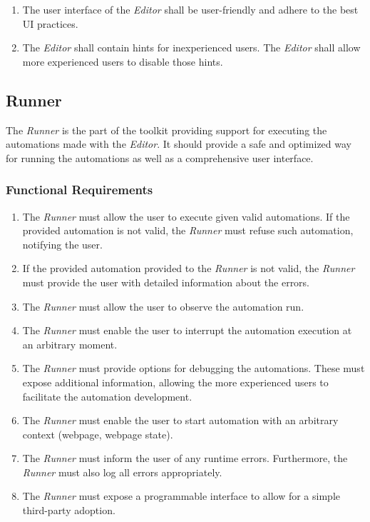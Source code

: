 \begin{enumerate}[label=\thesubsection.2.\arabic*]
    \item The user interface of the \textit{Editor} shall be user-friendly and adhere to the best \ac{UI} practices.
    \item The \textit{Editor} shall contain hints for inexperienced users. 
    The \textit{Editor} shall allow more experienced users to disable those hints.
\end{enumerate}

\subsection{Runner}

The \textit{Runner} is the part of the toolkit providing support for executing the automations made with the \textit{Editor}.
It should provide a safe and optimized way for running the automations as well as a comprehensive user interface.

\subsubsection{Functional Requirements}

\begin{enumerate}[label=\thesubsection.1.\arabic*]
    \item The \textit{Runner} must allow the user to execute given valid automations. 
    If the provided automation is not valid, the \textit{Runner} must refuse such automation, notifying the user.
    \item If the provided automation provided to the \textit{Runner} is not valid, 
    the \textit{Runner} must provide the user with detailed information about the errors.
    \item The \textit{Runner} must allow the user to observe the automation run.
    \item The \textit{Runner} must enable the user to interrupt the automation execution at an arbitrary moment.
    \item The \textit{Runner} must provide options for debugging the automations. 
    These must expose additional information, allowing the more experienced users to facilitate the automation development.
    \item The \textit{Runner} must enable the user to start automation with an arbitrary context (webpage, webpage state).
    \item The \textit{Runner} must inform the user of any runtime errors. 
    Furthermore, the \textit{Runner} must also log all errors appropriately.
    \item The \textit{Runner} must expose a programmable interface to allow for a simple third-party adoption.
\end{enumerate}

